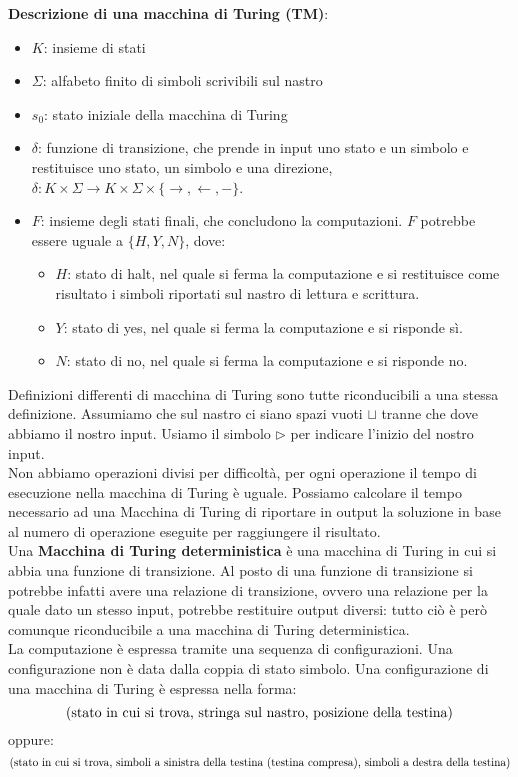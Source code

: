 \textbf{Descrizione di una macchina di Turing (TM)}:
\begin{itemize}
    \itemsep1pt\parskip0pt
    \item $K$: insieme di stati
    \item $\Sigma$: alfabeto finito di simboli scrivibili sul nastro
    \item $s_0$: stato iniziale della macchina di Turing
    \item $\delta$: funzione di transizione, che prende in input uno stato e un simbolo e restituisce uno stato, un simbolo e una direzione, $\delta : K \times \Sigma \to K \times \Sigma \times \{\to, \leftarrow, -\}$.
    \item $F$: insieme degli stati finali, che concludono la computazioni. $F$
      potrebbe essere uguale a $\{H, Y, N\}$, dove:
        \begin{itemize}
            \item $H$: stato di halt, nel quale si ferma la computazione e si restituisce come risultato i simboli riportati sul nastro di lettura e scrittura.
            \item $Y$: stato di yes, nel quale si ferma la computazione e si risponde  sì.
            \item $N$: stato di no, nel quale si ferma la computazione e si risponde no. 
      \end{itemize}
\end{itemize}

Definizioni differenti di macchina di Turing sono tutte riconducibili a una stessa definizione.
Assumiamo che sul nastro ci siano spazi vuoti $\sqcup$ tranne che dove abbiamo il nostro input. Usiamo il simbolo $\triangleright$ per indicare l'inizio del nostro input.\\
Non abbiamo operazioni divisi per difficoltà, per ogni operazione il tempo di esecuzione nella macchina di Turing è uguale. Possiamo calcolare il tempo necessario ad una Macchina di Turing di riportare in output la soluzione in base al numero di operazione eseguite per raggiungere il risultato. \\

Una \textbf{Macchina di Turing deterministica} è una macchina di Turing in cui si abbia una funzione di transizione. Al posto di una funzione di transizione si potrebbe infatti avere una relazione di transizione, ovvero una relazione per la quale dato un stesso input, potrebbe restituire output diversi: tutto ciò è però comunque riconducibile a una macchina di Turing deterministica.\\
La computazione è espressa tramite una sequenza di configurazioni. Una configurazione non è data dalla coppia di stato simbolo. Una configurazione di una macchina di Turing è espressa nella forma: 
$$\textnormal{(stato in cui si trova, stringa sul nastro, posizione della testina)}$$  oppure:
$$\textnormal{(stato in cui si trova, simboli a sinistra della testina (testina compresa), simboli a destra della testina)}$$

